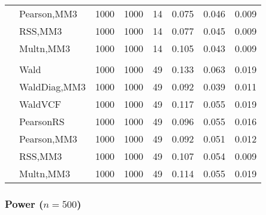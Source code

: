 \documentclass[
]{article}
\begin{document}
\begin{table}[H]
{\begin{tabular}[t]{llrrrrrr}
\hspace{1em} & Pearson,MM3 & 1000 & 1000 & 14 & 0.075 & 0.046 & 0.009\\

\hspace{1em} & RSS,MM3 & 1000 & 1000 & 14 & 0.077 & 0.045 & 0.009\\

\hspace{1em} & Multn,MM3 & 1000 & 1000 & 14 & 0.105 & 0.043 & 0.009\\
\cmidrule{1-8}
\addlinespace[0.3em]
\multicolumn{8}{l}{\textbf{3F 15V}}\\
\hspace{1em} & Wald & 1000 & 1000 & 49 & 0.133 & 0.063 & 0.019\\

\hspace{1em} & WaldDiag,MM3 & 1000 & 1000 & 49 & 0.092 & 0.039 & 0.011\\

\hspace{1em} & WaldVCF & 1000 & 1000 & 49 & 0.117 & 0.055 & 0.019\\

\hspace{1em} & PearsonRS & 1000 & 1000 & 49 & 0.096 & 0.055 & 0.016\\

\hspace{1em} & Pearson,MM3 & 1000 & 1000 & 49 & 0.092 & 0.051 & 0.012\\

\hspace{1em} & RSS,MM3 & 1000 & 1000 & 49 & 0.107 & 0.054 & 0.009\\

\hspace{1em} & Multn,MM3 & 1000 & 1000 & 49 & 0.114 & 0.055 & 0.019\\
\bottomrule
\end{tabular}}
\end{table}

\hypertarget{power-n500}{%
\subsubsection{\texorpdfstring{Power
(\(n=500\))}{Power (n=500)}}\label{power-n500}}
\end{document}
